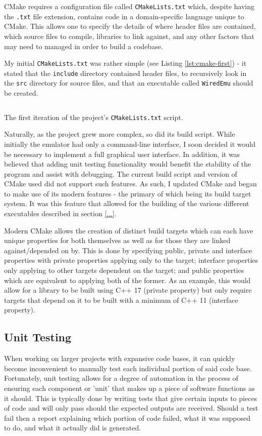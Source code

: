     CMake requires a configuration file called \texttt{CMakeLists.txt} which, despite having the \texttt{.txt} file extension, contains code in a domain-specific language unique to CMake. This allows one to specify the details of where header files are contained, which source files to compile, libraries to link against, and any other factors that may need to managed in order to build a codebase.

    My initial \texttt{CMakeLists.txt} was rather simple (see Listing \ref{lst:cmake-first}) - it stated that the \texttt{include} directory contained header files, to recursively look in the \texttt{src} directory for source files, and that an executable called \texttt{WiredEmu} should be created.

    \begin{listing}[h]
        \inputminted{cmake}{cmake/first.CMakeLists.txt}
        \caption{The first iteration of the project's \texttt{CMakeLists.txt} script.}
        \label{lst:cmake-first}
    \end{listing}

    Naturally, as the project grew more complex, so did its build script. While initially the emulator had only a command-line interface, I soon decided it would be necessary to implement a full graphical user interface. In addition, it was believed that adding unit testing functionality would benefit the stability of the program and assist with debugging. The current build script and version of CMake used did not support such features. As such, I updated CMake and began to make use of its modern features - the primary of which being its build target system. It was this feature that allowed for the building of the various different executables described in section \ref{...}.

    Modern CMake allows the creation of distinct build targets which can each have unique properties for both themselves as well as for those they are linked against/depended on by. This is done by specifying public, private and interface properties with private properties applying only to the target; interface properties only applying to other targets dependent on the target; and public properties which are equivalent to applying both of the former. As an example, this would allow for a library to be built using C++ 17 (private property) but only require targets that depend on it to be built with a minimum of C++ 11 (interface property).

\subsection{Unit Testing}
    When working on larger projects with expansive code bases, it can quickly become inconvenient to manually test each individual portion of said code base. Fortunately, unit testing allows for a degree of automation in the process of ensuring each component or 'unit' that makes up a piece of software functions as it should. This is typically done by writing tests that give certain inputs to pieces of code and will only pass should the expected outputs are received. Should a test fail then a report explaining which portion of code failed, what it was supposed to do, and what it actually did is generated.

